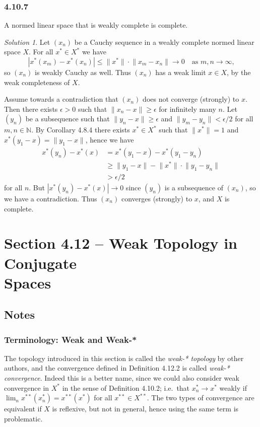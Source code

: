 \documentclass{report}
\newcommand{\bb}[1]{\mathbb{#1}}
\newcommand{\norm}[1]{{\lVert #1 \rVert}}
\theoremstyle{remark}
\newtheorem*{solution}{Solution}
\begin{document}
\subsubsection*{4.10.7}
A normed linear space that is weakly complete is complete.

\begin{solution}
  Let $(x_n)$ be a Cauchy sequence in a weakly complete normed linear space $X$. For all $x^* \in X^*$ we have
  \begin{equation*}
    |x^*(x_m) - x^*(x_n)| \le \norm{x^*} \cdot \norm{x_m - x_n} \to 0 \quad \text{as $m,n \to \infty$,}
  \end{equation*}
  so $(x_n)$ is weakly Cauchy as well. Thus $(x_n)$ has a weak limit $x \in X$, by the weak completeness of $X$.

  Assume towards a contradiction that $(x_n)$ does not converge (strongly) to $x$. Then there exists $\epsilon > 0$ such that $\norm{x_n - x} \ge \epsilon$ for infinitely many $n$. Let $(y_n)$ be a subsequence such that $\norm{y_n - x} \ge \epsilon$ and $\norm{y_m - y_n} < \epsilon/2$ for all $m,n \in \bb N$. By Corollary 4.8.4 there exists $x^* \in X^*$ such that $\norm{x^*} = 1$ and $x^*(y_1 - x) = \norm{y_1 - x}$, hence we have
  \begin{equation*}
    \begin{split}
      x^*(y_n) - x^*(x) &= x^*(y_1 - x) - x^*(y_1 - y_n) \\
      &\ge \norm{y_1 - x} - \norm{x^*} \cdot \norm{y_1 - y_n} \\
      &> \epsilon/2
    \end{split}
  \end{equation*}
  for all $n$. But $|x^*(y_n) - x^*(x)| \to 0$ since $(y_n)$ is a subsequence of $(x_n)$, so we have a contradiction. Thus $(x_n)$ converges (strongly) to $x$, and $X$ is complete.
\end{solution}




\section*{Section 4.12 -- Weak Topology in Conjugate\\ Spaces}

\subsection*{Notes}

\subsubsection*{Terminology: Weak and Weak-*}
The topology introduced in this section is called the \emph{weak-* topology} by other authors, and the convergence defined in Definition 4.12.2 is called \emph{weak-* convergence}. Indeed this is a better name, since we could also consider weak convergence in $X^*$ in the sense of Definition 4.10.2; i.e.\ that $x^*_n \to x^*$ weakly if $\lim_n x^{**}(x^*_n) = x^{**}(x^*)$ for all $x^{**} \in X^{**}$. The two types of convergence are equivalent if $X$ is reflexive, but not in general, hence using the same term is problematic.
\end{document}
